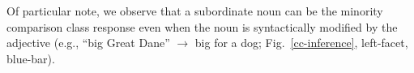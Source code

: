 \documentclass[10pt,letterpaper]{article}
\newcommand{\mht}[1]{\textcolor{Blue}{[mht: #1]}}
\newcommand{\pt}[1]{\textcolor{Purple}{[pt: #1]}}
\newcommand{\datafoldername}{R_results_TeX}
\newcommand{\rlnum}[2]{\num[output-decimal-marker={.},
                             exponent-product = \cdot,
                             round-mode=places,
                             round-precision=#2,
                             group-digits=false]{#1}}
\newcommand{\rlgetnum}[5]{\csvreader[filter strcmp={\mykey}{#3},
             late after line = {{,}\ }, late after last line = {{}}]
            {\datafoldername/#1}{#2=\mykey,#4=\myvalue}{\rlnum{\myvalue}{#5}}}
\begin{document}
Of particular note, we observe that a subordinate noun can be the minority comparison class response even when the noun is syntactically modified by the adjective (e.g., ``big Great Dane'' $\rightarrow$ big for a dog; Fig.~\ref{cc-inference}, left-facet, blue-bar). %




\end{document}
